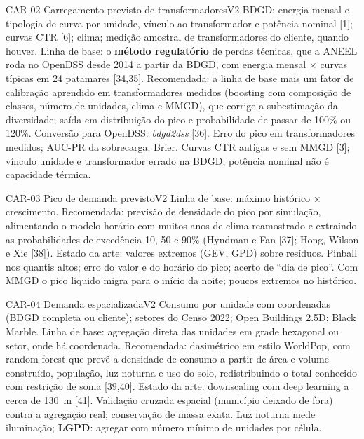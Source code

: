 \begin{ficha}{CAR-02 \textperiodcentered{} Carregamento previsto de transformadores}{V2}
 BDGD: energia mensal e tipologia de curva por unidade, vínculo
ao transformador e potência nominal [1]; curvas CTR [6]; clima; medição
amostral de transformadores do cliente, quando houver.
 Linha de base: o \textbf{método regulatório} de perdas
técnicas, que a ANEEL roda no OpenDSS desde 2014 a partir da BDGD, com
energia mensal × curvas típicas em 24 patamares [34,35]. Recomendada: a linha
de base mais um fator de calibração aprendido em transformadores medidos
(boosting com composição de classes, número de unidades, clima e MMGD), que
corrige a subestimação da diversidade; saída em distribuição do pico e
probabilidade de passar de 100\% ou 120\%. Conversão para OpenDSS:
\emph{bdgd2dss} [36].
 Erro do pico em transformadores medidos; AUC-PR da
sobrecarga; Brier.
 Curvas CTR antigas e sem MMGD [3]; vínculo unidade e
transformador errado na BDGD; potência nominal não é capacidade térmica.
\end{ficha}

\begin{ficha}{CAR-03 \textperiodcentered{} Pico de demanda previsto}{V2}
 Linha de base: máximo histórico × crescimento.
Recomendada: previsão de densidade do pico por simulação, alimentando o
modelo horário com muitos anos de clima reamostrado e extraindo as
probabilidades de excedência 10, 50 e 90\% (Hyndman e Fan [37]; Hong, Wilson
e Xie [38]). Estado da arte: valores extremos (GEV, GPD) sobre resíduos.
 Pinball nos quantis altos; erro do valor e do horário do
pico; acerto de ``dia de pico''.
 Com MMGD o pico líquido migra para o início da noite;
poucos extremos no histórico.
\end{ficha}

\begin{ficha}{CAR-04 \textperiodcentered{} Demanda espacializada}{V2}
 Consumo por unidade com coordenadas (BDGD completa ou
cliente); setores do Censo 2022; Open Buildings 2.5D; Black Marble.
 Linha de base: agregação direta das unidades em grade
hexagonal ou setor, onde há coordenada. Recomendada: dasimétrico em estilo
WorldPop, com random forest que prevê a densidade de consumo a partir de área
e volume construído, população, luz noturna e uso do solo, redistribuindo o
total conhecido com restrição de soma [39,40]. Estado da arte:
downscaling com deep learning a cerca de 130~m [41].
 Validação cruzada espacial (município deixado de fora)
contra a agregação real; conservação de massa exata.
 Luz noturna mede iluminação; \textbf{LGPD}: agregar com
número mínimo de unidades por célula.
\end{ficha}

